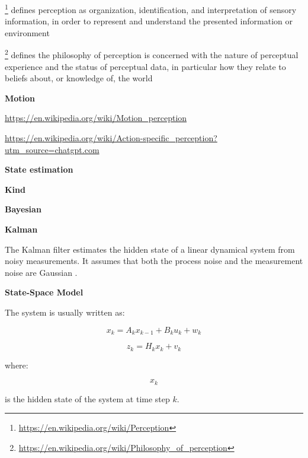 \documentclass{book}
\providecommand{\ProjectDeepHeading}[2]{%
    \par\medskip\noindent\textbf{#2}\par\smallskip
}
\providecommand{\clickurlfooter}[1]{\footnote{\url{#1}}}
\begin{document}
\clickurlfooter{https://en.wikipedia.org/wiki/Perception} defines perception as organization, identification, and interpretation of sensory information, in order to represent and understand the presented information or environment


\clickurlfooter{https://en.wikipedia.org/wiki/Philosophy_of_perception} defines the philosophy of perception is concerned with the nature of perceptual experience and the status of perceptual data, in particular how they relate to beliefs about, or knowledge of, the world

\ProjectDeepHeading{4}{Motion}


\url{https://en.wikipedia.org/wiki/Motion_perception}
    
    \url{https://en.wikipedia.org/wiki/Action-specific_perception?utm_source=chatgpt.com}

\ProjectDeepHeading{4}{State estimation}

\ProjectDeepHeading{5}{Kind}

\ProjectDeepHeading{6}{Bayesian}

\ProjectDeepHeading{7}{Kalman}


The Kalman filter estimates the hidden state of a linear dynamical system from noisy measurements. It assumes that both the process noise and the measurement noise are Gaussian \cite{kalman-1960-a-new-approach-to-linear-filtering-and-prediction-problems}.
    
    
    \ProjectDeepHeading{10}{State-Space Model}
        
        The system is usually written as:
        
        \[
            x_k = A_k x_{k-1} + B_k u_k + w_k
        \]
        
        \[
            z_k = H_k x_k + v_k
        \]
        
        where:
        
        \[
            x_k
        \]
        
        is the hidden state of the system at time step \(k\).
        
\end{document}
